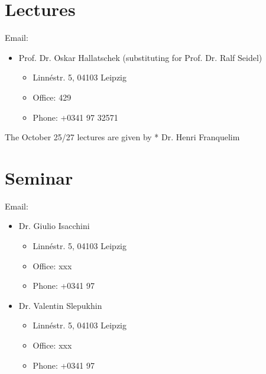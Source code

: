 \documentclass[letterpaper,10pt,english]{sphinxmanual}
\begin{document}
\section{Lectures}
\label{\detokenize{course-info/instructors:lectures}}
\sphinxAtStartPar
Email: 
\begin{itemize}
\item {} 
\sphinxAtStartPar
Prof. Dr. Oskar Hallatschek (substituting for Prof. Dr. Ralf Seidel)
\begin{itemize}
\item {} 
\sphinxAtStartPar
Linnéstr. 5, 04103 Leipzig

\item {} 
\sphinxAtStartPar
Office: 429

\item {} 
\sphinxAtStartPar
Phone: +0341 97 32571

\end{itemize}

\end{itemize}

\sphinxAtStartPar
The October 25/27 lectures are given by
* Dr. Henri Franquelim


\section{Seminar}
\label{\detokenize{course-info/instructors:seminar}}
\sphinxAtStartPar
Email: 
\begin{itemize}
\item {} 
\sphinxAtStartPar
Dr. Giulio Isacchini
\begin{itemize}
\item {} 
\sphinxAtStartPar
Linnéstr. 5, 04103 Leipzig

\item {} 
\sphinxAtStartPar
Office: xxx

\item {} 
\sphinxAtStartPar
Phone: +0341 97

\end{itemize}

\item {} 
\sphinxAtStartPar
Dr. Valentin Slepukhin
\begin{itemize}
\item {} 
\sphinxAtStartPar
Linnéstr. 5, 04103 Leipzig

\item {} 
\sphinxAtStartPar
Office: xxx

\item {} 
\sphinxAtStartPar
Phone: +0341 97

\end{itemize}

\end{itemize}
\end{document}
